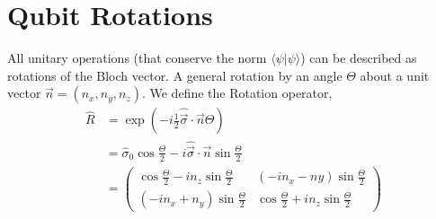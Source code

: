 \documentclass[lasers.tex]{subfiles}
\begin{document}
\section{Qubit Rotations}
All unitary operations (that conserve the norm $\langle\psi|\psi\rangle$) can be described as rotations of the Bloch vector. 
A general rotation by an angle $\Theta$ about a unit vector $\vec{n}=(n_x,n_y,n_z)$.
We define the Rotation operator, 
\begin{align}
    \hat{R} &= \exp\left(-i\frac12\hat{\vec{\sigma}}\cdot\vec{n}\Theta\right) \\
            &= \hat{\sigma}_0\cos\frac{\Theta}{2} - i\hat{\vec{\sigma}}\cdot\vec{n}\sin\frac{\Theta}{2} \\
            &= \begin{pmatrix} \cos\frac{\Theta}{2}-in_z\sin\frac{\Theta}{2} & \left(-in_x-ny\right)\sin\frac{\Theta}{2} \\ \left(-in_x+n_y\right)\sin\frac{\Theta}{2} & \cos\frac{\Theta}{2}+in_z\sin\frac{\Theta}{2}  \end{pmatrix}
\end{align}
\end{document}
